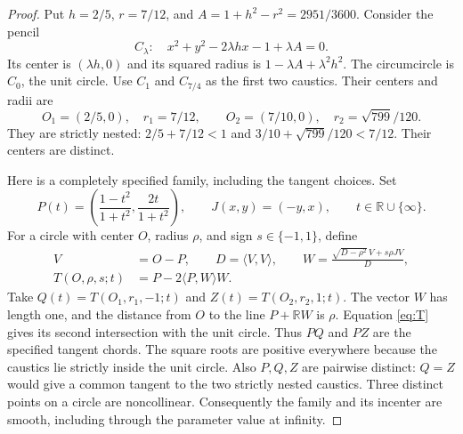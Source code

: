\documentclass[11pt]{article}
\newcommand{\R}{\mathbb R}
\newcommand{\dotp}[2]{\langle #1,#2\rangle}
\begin{document}
\begin{proof}
Put $h=2/5$, $r=7/12$, and $A=1+h^2-r^2=2951/3600$.
Consider the pencil
\[
 C_\lambda:\quad x^2+y^2-2\lambda h x-1+\lambda A=0.
\]
Its center is $(\lambda h,0)$ and its squared radius is
$1-\lambda A+\lambda^2h^2$.
The circumcircle is $C_0$, the unit circle.
Use $C_1$ and $C_{7/4}$ as the first two caustics. Their centers and
radii are
\[
 O_1=(2/5,0),\quad r_1=7/12,\qquad
 O_2=(7/10,0),\quad r_2=\sqrt{799}/120.
\]
They are strictly nested:
$2/5+7/12<1$ and $3/10+\sqrt{799}/120<7/12$.
Their centers are distinct.

Here is a completely specified family, including the tangent choices.
Set
\[
 P(t)=\left(\frac{1-t^2}{1+t^2},\frac{2t}{1+t^2}\right),
 \qquad J(x,y)=(-y,x),\qquad t\in\R\cup\{\infty\}.
\]
For a circle with center $O$, radius $\rho$, and sign
$s\in\{-1,1\}$, define
\begin{align}
 V&=O-P,\qquad D=\dotp{V}{V},\qquad
 W=\frac{\sqrt{D-\rho^2}\,V+s\rho JV}{D}, \label{eq:W}\\
 T(O,\rho,s;t)&=P-2\dotp{P}{W}W. \label{eq:T}
\end{align}
Take $Q(t)=T(O_1,r_1,-1;t)$ and
$Z(t)=T(O_2,r_2,1;t)$.
The vector $W$ has length one, and the distance from $O$ to the
line $P+\R W$ is $\rho$. Equation \eqref{eq:T} gives its second
intersection with the unit circle. Thus $PQ$ and $PZ$ are the
specified tangent chords. The square roots are positive everywhere
because the caustics lie strictly inside the unit circle.
Also $P,Q,Z$ are pairwise distinct: $Q=Z$ would give a common
tangent to the two strictly nested caustics. Three distinct points
on a circle are noncollinear. Consequently the family and its
incenter are smooth, including through the parameter value at infinity.


\end{proof}
\end{document}
